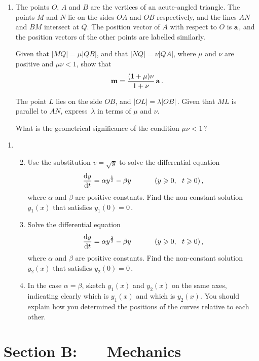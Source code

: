 \documentclass[a4, 11pt]{report}
\newlength{\qspace}
\newcounter{qnumber}
\newenvironment{question}%
 {\vspace{\qspace}
  \begin{enumerate}[\bfseries 1\quad][10]%
    \setcounter{enumi}{\value{qnumber}}%
    \item%
 }
{
  \end{enumerate}
  \filbreak
  \stepcounter{qnumber}
 }
\newenvironment{questionparts}[1][1]%
 {
  \begin{enumerate}[\bfseries (i)]%
    \setcounter{enumii}{#1}
    \addtocounter{enumii}{-1}
    \setlength{\itemsep}{5mm}
    \setlength{\parskip}{5pt}
 }
 {
  \end{enumerate}
 }
\def\d{{\rm d}}
\def\ge{\geqslant}
\begin{document}
\begin{question}
The points $O$, $A$ and $B$ are the vertices 
of an acute-angled triangle. The points $M$ and $N$
lie on the sides $OA$ and $OB$ respectively, and the lines
$AN$ and $BM$  
intersect at $Q$. The position vector of $A$ with respect to 
$O$ is $\bf a$,  and the position vectors of the 
 other points are labelled similarly.

Given that $\vert MQ \vert = \mu \vert QB\vert $, and that
$\vert NQ \vert = \nu \vert QA\vert $, where $\mu$ and $\nu$ are positive and
 $\mu \nu <1$, show that
\[
{\bf m} = 
\frac {(1+\mu)\nu}{1+\nu} \,
{\bf a}
\,.
\]

The point $L$ lies
on
the
 side $OB$, and $\vert OL \vert = \lambda \vert OB \vert \,$.
Given that $ML$ is parallel to  $AN$,
express~$\lambda$ in terms of $\mu$ and $\nu$.

What is the geometrical significance of the condition $\mu\nu<1\,$?
\end{question}


\begin{question}
\begin{questionparts}
\item Use the substitution $v= \sqrt y$ 
to solve the differential equation
\[
\frac{\d y}{\d t} = \alpha y^{\frac12} - \beta y
\ \ \ \ \ \ \ \ \ \ (y\ge0, \ \ t\ge0)
\,,   
\]
where $\alpha$ and $\beta$ are positive constants.
Find the non-constant solution
$y_1(x)$
that satisfies $y_1(0)=0\,$. 

\item
Solve the differential equation
\[
\frac{\d y}{\d t} = \alpha y^{\frac23}  - \beta y
\ \ \ \ \ \ \ \ \ \ (y\ge0, \ \ t\ge0)
\,,
\]
where $\alpha$ and $\beta$ are positive constants.
Find the non-constant solution 
$y_2(x)$
 that satisfies
$y_2(0)=0\,$.

\item In the case $\alpha=\beta$, sketch 
$y_1(x)$ and $y_2(x)$ 
 on the same 
axes, indicating clearly which is 
$y_1(x)$ and which is $y_2(x)$.
You should explain how   you determined the positions of the
curves relative to each other.

\end{questionparts}
 
\end{question}

\newpage
\section*{Section B: \ \ \ Mechanics}
\end{document}

